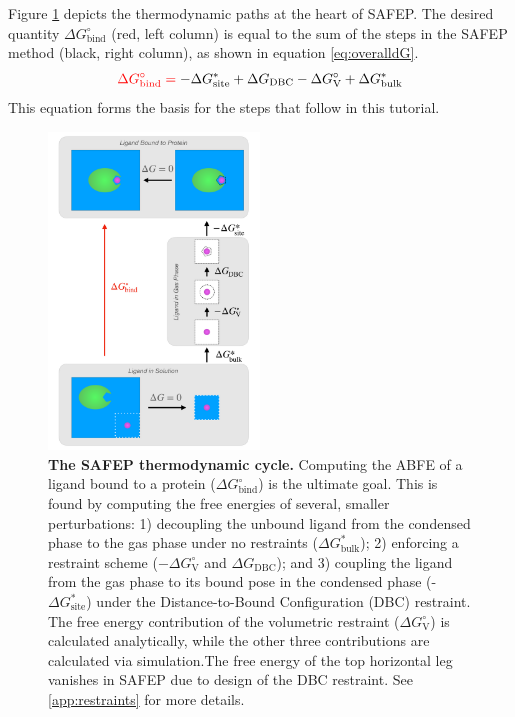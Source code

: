 \documentclass[9pt,tutorial]{Styling/livecoms}
\begin{document}
Figure \ref{fig:cycle} depicts the thermodynamic paths at the heart of SAFEP. 
The desired quantity $\Delta G^\circ_\mathrm{bind}$ (red, left column) is equal to the sum of the steps in the SAFEP method (black, right column), as shown in equation \ref{eq:overalldG}. 
\begin{equation}\label{eq:overalldG}
    \color{red} \Delta G^\circ_\mathrm{bind} = \color{black} - \Delta G_\mathrm{site}^* + \Delta G_\mathrm{DBC} - \Delta G^\circ_\mathrm{V} + \Delta G^*_\mathrm{bulk} 
\end{equation}
\noindent This equation forms the basis for the steps that follow in this tutorial. 

\begin{figure}[!ht]
    \centering
    \includegraphics[width=0.5\textwidth]{SAFEP_cycle.pdf}
    \caption{\textbf{The SAFEP thermodynamic cycle.} 
    Computing the ABFE of a ligand bound to a protein ($\Delta G^\circ_\mathrm{bind}$) is the ultimate goal. 
    This is found by computing the free energies of several, smaller perturbations: 1) decoupling the unbound ligand from the condensed phase to the gas phase under no restraints ($\Delta G^*_{\mathrm{bulk}}$); 2) enforcing a restraint scheme ($-\Delta G^\circ_\mathrm{V}$ and $\Delta G_\mathrm{DBC}$); and 3) coupling the ligand from the gas phase to its bound pose in the condensed phase (-$\Delta G^*_{\mathrm{site}}$) under the Distance-to-Bound Configuration (DBC) restraint.
    The free energy contribution of the volumetric restraint ($\Delta G^\circ_\mathrm{V}$) is calculated analytically, while the other three contributions are calculated via simulation.The free energy of the top horizontal leg vanishes in SAFEP due to design of the DBC restraint. See \ref{app:restraints} for more details.}
    \label{fig:cycle}
\end{figure}
\end{document}
